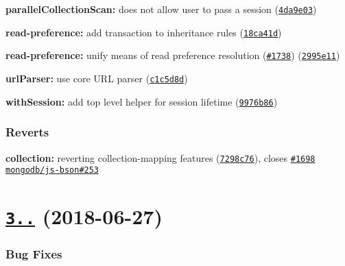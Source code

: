 \begin{DoxyItemize}
\item {\bfseries parallel\+Collection\+Scan\+:} does not allow user to pass a session (\href{https://github.com/mongodb/node-mongodb-native/commit/4da9e03}{\tt 4da9e03})
\item {\bfseries read-\/preference\+:} add transaction to inheritance rules (\href{https://github.com/mongodb/node-mongodb-native/commit/18ca41d}{\tt 18ca41d})
\item {\bfseries read-\/preference\+:} unify means of read preference resolution (\href{https://github.com/mongodb/node-mongodb-native/issues/1738}{\tt \#1738}) (\href{https://github.com/mongodb/node-mongodb-native/commit/2995e11}{\tt 2995e11})
\item {\bfseries url\+Parser\+:} use core U\+RL parser (\href{https://github.com/mongodb/node-mongodb-native/commit/c1c5d8d}{\tt c1c5d8d})
\item {\bfseries with\+Session\+:} add top level helper for session lifetime (\href{https://github.com/mongodb/node-mongodb-native/commit/9976b86}{\tt 9976b86})
\end{DoxyItemize}

\subsubsection*{Reverts}


\begin{DoxyItemize}
\item {\bfseries collection\+:} reverting collection-\/mapping features (\href{https://github.com/mongodb/node-mongodb-native/commit/7298c76}{\tt 7298c76}), closes \href{https://github.com/mongodb/node-mongodb-native/issues/1698}{\tt \#1698} \href{https://github.com/mongodb/js-bson/issues/253}{\tt mongodb/js-\/bson\#253}
\end{DoxyItemize}

\label{_3.1.0}%
 \section*{\href{https://github.com/mongodb/node-mongodb-native/compare/v3.0.6...v3.1.0}{\tt 3..} (2018-\/06-\/27)}

\subsubsection*{Bug Fixes}


